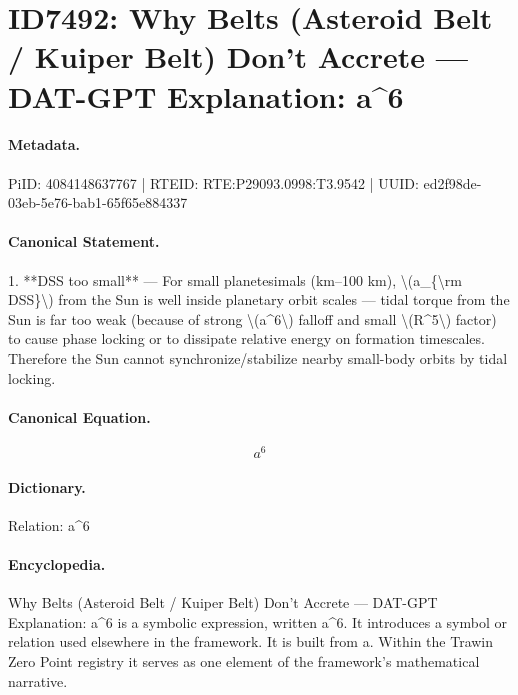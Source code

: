 \section*{ID7492: Why Belts (Asteroid Belt / Kuiper Belt) Don’t Accrete — DAT-GPT Explanation: a\textasciicircum{}6}
\paragraph{Metadata.}
PiID: 4084148637767 | RTEID: RTE:P29093.0998:T3.9542 | UUID: ed2f98de-03eb-5e76-bab1-65f65e884337

\paragraph{Canonical Statement.}
1. **DSS too small** — For small planetesimals (km–100 km), \textbackslash{}(a\_\{\textbackslash{}rm DSS\}\textbackslash{}) from the Sun is well inside planetary orbit scales — tidal torque from the Sun is far too weak (because of strong \textbackslash{}(a\textasciicircum{}6\textbackslash{}) falloff and small \textbackslash{}(R\textasciicircum{}5\textbackslash{}) factor) to cause phase locking or to dissipate relative energy on formation timescales. Therefore the Sun cannot synchronize/stabilize nearby small-body orbits by tidal locking.

\paragraph{Canonical Equation.}
\[
a^6
\]

\paragraph{Dictionary.}
Relation: a\textasciicircum{}6

\paragraph{Encyclopedia.}
Why Belts (Asteroid Belt / Kuiper Belt) Don’t Accrete — DAT-GPT Explanation: a\textasciicircum{}6 is a symbolic expression, written a\textasciicircum{}6. It introduces a symbol or relation used elsewhere in the framework. It is built from a. Within the Trawin Zero Point registry it serves as one element of the framework's mathematical narrative.
